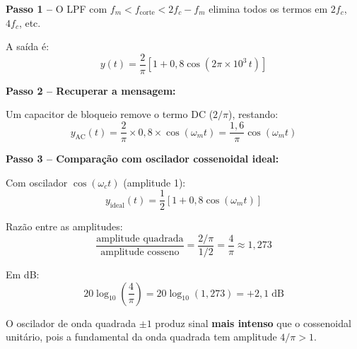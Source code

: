 \documentclass[11pt,a4paper]{article}
\begin{document}
\begin{resolucao}

\textbf{Passo 1 --} O LPF com $f_m < f_{\text{corte}} < 2f_c - f_m$ elimina todos os termos em $2f_c$, $4f_c$, etc.

A saída é:
\[
  \boxed{y(t) = \frac{2}{\pi}[1 + 0{,}8\cos(2\pi \times 10^3\,t)]}
\]

\textbf{Passo 2 -- Recuperar a mensagem:}

Um capacitor de bloqueio remove o termo DC ($2/\pi$), restando:
\[
  y_{\text{AC}}(t) = \frac{2}{\pi} \times 0{,}8 \times \cos(\omega_m t) = \frac{1{,}6}{\pi}\cos(\omega_m t)
\]

\textbf{Passo 3 -- Comparação com oscilador cossenoidal ideal:}

Com oscilador $\cos(\omega_c t)$ (amplitude 1):
\[
  y_{\text{ideal}}(t) = \frac{1}{2}[1 + 0{,}8\cos(\omega_m t)]
\]

Razão entre as amplitudes:
\[
  \frac{\text{amplitude quadrada}}{\text{amplitude cosseno}} = \frac{2/\pi}{1/2} = \frac{4}{\pi} \approx 1{,}273
\]

Em dB:
\[
  \boxed{20\log_{10}\!\left(\frac{4}{\pi}\right) = 20\log_{10}(1{,}273) = +2{,}1\;\text{dB}}
\]

O oscilador de onda quadrada $\pm 1$ produz sinal \textbf{mais intenso} que o cossenoidal unitário, pois a fundamental da onda quadrada tem amplitude $4/\pi > 1$.
\end{resolucao}
\end{document}
